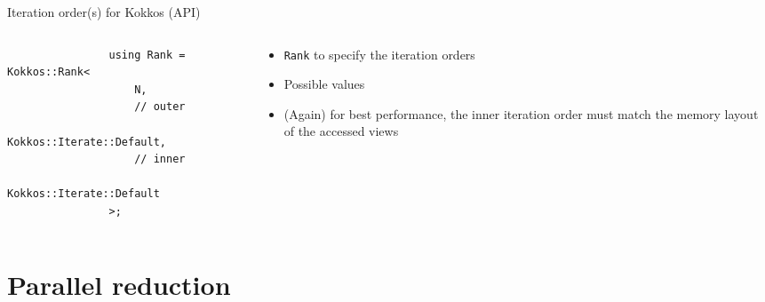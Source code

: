 \documentclass[
    aspectratio=169,
    \createHandout
]{beamer}
\begin{document}
\begin{frame}[fragile]{Iteration order(s) for Kokkos (API)}
    \begin{columns}
        \begin{column}{0.5\linewidth}
            \begin{verbatim}
                using Rank = Kokkos::Rank<
                    N,
                    // outer
                    Kokkos::Iterate::Default,
                    // inner
                    Kokkos::Iterate::Default
                >;
            \end{verbatim}
        \end{column}
        \begin{column}{0.5\linewidth}
            \begin{itemize}
                \item \texttt{Rank} to specify the iteration orders
                \item Possible values
                \item (Again) for best performance, the inner iteration order must match the memory layout of the accessed views
            \end{itemize}
        \end{column}
    \end{columns}
\end{frame}


\section{Parallel reduction}

\end{document}
